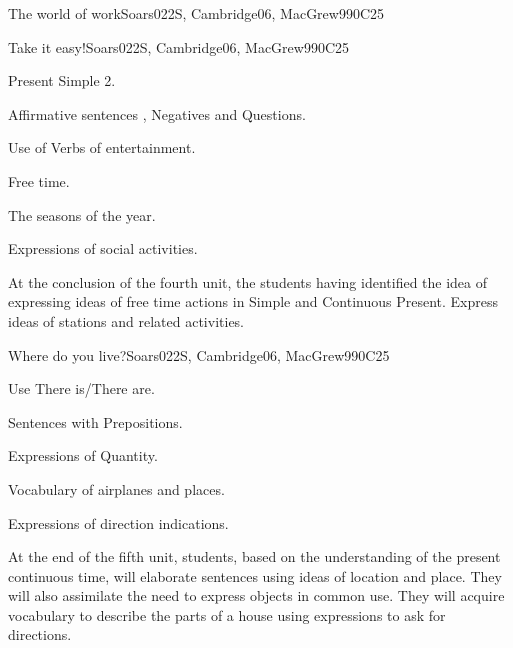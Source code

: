 \begin{syllabus}
\begin{unit}{The world of work}{}{Soars022S, Cambridge06, MacGrew99}{0}{C25}
\end{unit}

\begin{unit}{Take it easy!}{}{Soars022S, Cambridge06, MacGrew99}{0}{C25}
   \begin{topics}
      \item Present Simple 2.
      \item Affirmative sentences , Negatives and Questions.
      \item Use of Verbs of entertainment.
      \item Free time.
      \item The seasons of the year.
      \item Expressions of social activities.
   \end{topics}

   \begin{learningoutcomes}
      \item At the conclusion of the fourth unit, the students having identified the idea of expressing ideas of free time actions in Simple and Continuous Present. Express ideas of stations and related activities.
   \end{learningoutcomes}

\end{unit}

\begin{unit}{Where do you live?}{}{Soars022S, Cambridge06, MacGrew99}{0}{C25}
   \begin{topics}
      \item Use There is/There are.
      \item Sentences with Prepositions.
      \item Expressions of Quantity.
      \item Vocabulary of airplanes and places.
      \item Expressions of direction indications.
   \end{topics}

   \begin{learningoutcomes}
      \item At the end of the fifth unit, students, based on the understanding of the present continuous time, will elaborate sentences using ideas of location and place. They will also assimilate the need to express objects in common use. They will acquire vocabulary to describe the parts of a house using expressions to ask for directions.
   \end{learningoutcomes}


\end{unit}
\end{syllabus}
